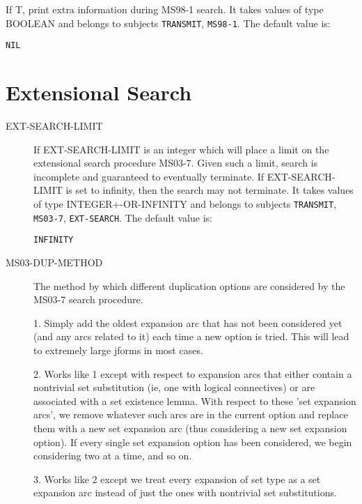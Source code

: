 \begin{description}
\item[MS98-VERBOSE]  
If T, print extra information during MS98-1 search.
It takes values of type BOOLEAN and belongs to subjects \texttt{TRANSMIT}, \texttt{MS98-1}.  The default value is: \begin{lstlisting}
NIL
\end{lstlisting}

\item
\end{description}

\section{Extensional Search}

\begin{description} 
\item[EXT-SEARCH-LIMIT]  
If EXT-SEARCH-LIMIT is an integer which will place a limit on the extensional search
procedure MS03-7.  Given such a limit, search is incomplete and guaranteed to eventually terminate.
If EXT-SEARCH-LIMIT is set to infinity, then the search may not terminate.
It takes values of type INTEGER+-OR-INFINITY and belongs to subjects \texttt{TRANSMIT}, \texttt{MS03-7}, \texttt{EXT-SEARCH}.  The default value is: \begin{lstlisting}
INFINITY
\end{lstlisting}

\item[MS03-DUP-METHOD]  
The method by which different duplication options are considered
by the MS03-7 search procedure.

1.  Simply add the oldest expansion arc that has not been considered yet
(and any arcs related to it) each time a new option is tried.
This will lead to extremely large jforms in most cases.

2.  Works like 1 except with respect to expansion arcs that either
contain a nontrivial set substitution (ie, one with logical connectives)
or are associated with a set existence lemma.  With respect to these
'set expansion arcs', we remove whatever such arcs are in the current
option and replace them with a new set expansion arc (thus considering
a new set expansion option).  If every single set expansion option
has been considered, we begin considering two at a time, and so on.

3.  Works like 2 except we treat every expansion of set type
as a set expansion arc instead of just the ones with nontrivial
set substitutions.


\end{description}
